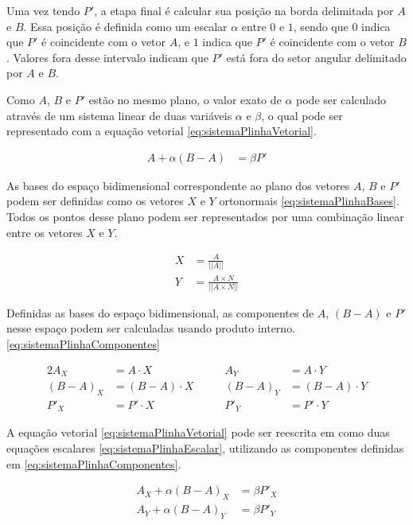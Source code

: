 \documentclass[brazil,pagestart=firstchapter]{abnt}
\begin{document}
Uma vez tendo $P'$, a etapa final é calcular sua posição na borda delimitada
por $A$ e $B$. Essa posição é definida como um escalar $\alpha$ entre $0$ e
$1$, sendo que $0$ indica que $P'$ é coincidente com o vetor $A$, e $1$
indica que $P'$ é coincidente com o vetor $B$. Valores fora desse intervalo
indicam que $P'$ está fora do setor angular delimitado por $A$ e $B$.

Como $A$, $B$ e $P'$ estão no mesmo plano, o valor exato de $\alpha$ pode
ser calculado através de um sistema linear de duas variáveis $\alpha$ e
$\beta$, o qual pode ser representado com a equação vetorial
\eqref{eq:sistemaPlinhaVetorial}.

\begin{align}
\label{eq:sistemaPlinhaVetorial}
A   + \alpha (B-A)   & = \beta P'
\end{align}

As bases do espaço bidimensional correspondente ao plano dos vetores $A$,
$B$ e $P'$ podem ser definidas como os vetores $X$ e $Y$ ortonormais
\eqref{eq:sistemaPlinhaBases}. Todos os pontos desse plano podem ser
representados por uma combinação linear entre os vetores $X$ e $Y$.

\begin{align}
\label{eq:sistemaPlinhaBases}
X & = \frac{A}{ || A || }                     \\
Y & = \frac{A \times N}{ || A \times N || }   \nonumber
\end{align}

Definidas as bases do espaço bidimensional, as componentes de $A$, $(B-A)$ e
$P'$ nesse espaço podem ser calculadas usando produto interno.
\eqref{eq:sistemaPlinhaComponentes}

\begin{alignat}{2}
\label{eq:sistemaPlinhaComponentes}
A_X     & = A \cdot X     & \qquad A_Y     & = A \cdot Y      \\
(B-A)_X & = (B-A) \cdot X & \qquad (B-A)_Y & = (B-A) \cdot Y  \nonumber \\
P'_X    & = P' \cdot X    & \qquad P'_Y    & = P' \cdot Y     \nonumber
\end{alignat}

A equação vetorial \eqref{eq:sistemaPlinhaVetorial} pode ser reescrita em
como duas equações escalares \eqref{eq:sistemaPlinhaEscalar}, utilizando as
componentes definidas em \eqref{eq:sistemaPlinhaComponentes}.

\begin{align}
\label{eq:sistemaPlinhaEscalar}
A_X + \alpha (B-A)_X & = \beta P'_X  \\
A_Y + \alpha (B-A)_Y & = \beta P'_Y  \nonumber
\end{align}
\end{document}
